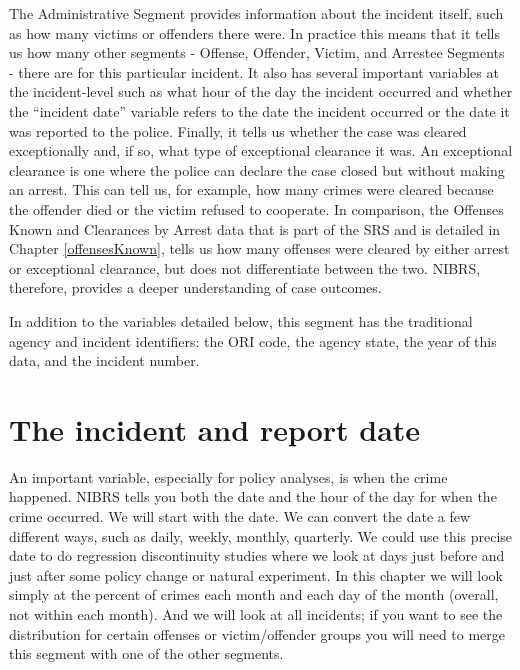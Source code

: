 \documentclass[
]{krantz}
\begin{document}
The Administrative Segment provides information about the
incident itself, such as how many victims or offenders there
were. In practice this means that it tells us how many other
segments - Offense, Offender, Victim, and Arrestee Segments
- there are for this particular incident. It also has
several important variables at the incident-level such as
what hour of the day the incident occurred and whether the
``incident date'' variable refers to the date the incident
occurred or the date it was reported to the police. Finally,
it tells us whether the case was cleared exceptionally and,
if so, what type of exceptional clearance it was. An
exceptional clearance is one where the police can declare
the case closed but without making an arrest. This can tell
us, for example, how many crimes were cleared because the
offender died or the victim refused to cooperate. In
comparison, the Offenses Known and Clearances by Arrest data
that is part of the SRS and is detailed in Chapter
\ref{offensesKnown}, tells us how many offenses were cleared
by either arrest or exceptional clearance, but does not
differentiate between the two. NIBRS, therefore, provides a
deeper understanding of case outcomes.

In addition to the variables detailed below, this segment
has the traditional agency and incident identifiers: the ORI
code, the agency state, the year of this data, and the
incident number.

\section{The incident and report
date}\label{the-incident-and-report-date}

An important variable, especially for policy analyses, is
when the crime happened. NIBRS tells you both the date and
the hour of the day for when the crime occurred. We will
start with the date. We can convert the date a few different
ways, such as daily, weekly, monthly, quarterly. We could
use this precise date to do regression discontinuity studies
where we look at days just before and just after some policy
change or natural experiment. In this chapter we will look
simply at the percent of crimes each month and each day of
the month (overall, not within each month). And we will look
at all incidents; if you want to see the distribution for
certain offenses or victim/offender groups you will need to
merge this segment with one of the other segments.
\end{document}
